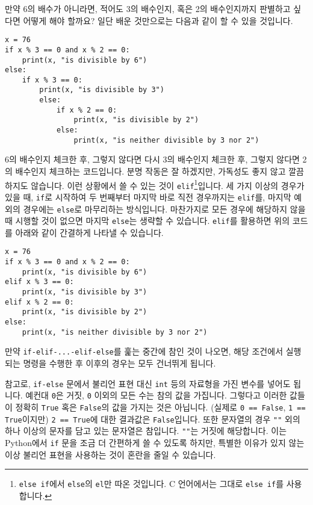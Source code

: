 \documentclass[../main.tex]{subfiles}
\begin{document}
만약 6의 배수가 아니라면, 적어도 3의 배수인지, 혹은 2의 배수인지까지 판별하고
싶다면 어떻게 해야 할까요?
일단 배운 것만으로는 다음과 같이 할 수 있을 것입니다.
\begin{verbatim}
x = 76
if x % 3 == 0 and x % 2 == 0:
    print(x, "is divisible by 6")
else:
    if x % 3 == 0:
        print(x, "is divisible by 3")
        else:
            if x % 2 == 0:
                print(x, "is divisible by 2")
            else:
                print(x, "is neither divisible by 3 nor 2")
\end{verbatim}
6의 배수인지 체크한 후, 그렇지 않다면 다시 3의 배수인지 체크한 후, 그렇지
않다면 2의 배수인지 체크하는 코드입니다.  분명 작동은 잘 하겠지만, 가독성도
좋지 않고 깔끔하지도 않습니다.  이런 상황에서 쓸 수 있는 것이
\texttt{elif}\footnote{\texttt{else if}에서 \texttt{else}의 \texttt{el}만 따온
것입니다. C 언어에서는 그대로 \texttt{else if}를 사용합니다.}입니다.  세 가지
이상의 경우가 있을 때, \texttt{if}로 시작하여 두 번째부터 마지막 바로 직전
경우까지는 \texttt{elif}를, 마지막 예외의 경우에는 \texttt{else}로 마무리하는
방식입니다.  마찬가지로 모든 경우에 해당하지 않을 때 시행할 것이 없으면 마지막
\texttt{else}는 생략할 수 있습니다.  \texttt{elif}를 활용하면 위의 코드를
아래와 같이 간결하게 나타낼 수 있습니다.
\begin{verbatim}
x = 76
if x % 3 == 0 and x % 2 == 0:
    print(x, "is divisible by 6")
elif x % 3 == 0:
    print(x, "is divisible by 3")
elif x % 2 == 0:
    print(x, "is divisible by 2")
else:
    print(x, "is neither divisible by 3 nor 2")
\end{verbatim}
만약 \texttt{if-elif-...-elif-else}를 훑는 중간에 참인 것이 나오면, 해당
조건에서 실행되는 명령을 수행한 후 이후의 경우는 모두 건너뛰게 됩니다.

참고로, \texttt{if-else} 문에서 불리언 표현 대신 \texttt{int} 등의 자료형을 가진
변수를 넣어도 됩니다. 예컨대
\texttt{0}은 거짓, \texttt{0} 이외의 모든 수는 참의 값을 가집니다.
그렇다고 이러한 값들이 정확히
\texttt{True} 혹은 \texttt{False}의 값을 가지는 것은 아닙니다. (실제로
\texttt{0 == False}, \texttt{1 == True}이지만)
\texttt{2 == True}에 대한 결과값은 \texttt{False}입니다.  또한
문자열의 경우 \texttt{""} 외의 하나 이상의 문자를 담고 있는 문자열은 참입니다.
\texttt{""}는 거짓에 해당합니다.
이는 Python에서 \texttt{if} 문을 조금 더 간편하게 쓸 수 있도록 하지만, 특별한
이유가 있지 않는 이상 불리언 표현을 사용하는 것이 혼란을 줄일 수 있습니다.
\end{document}
